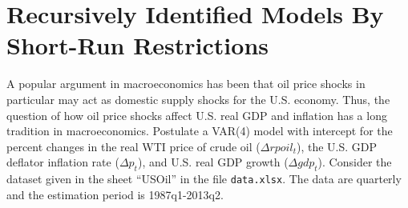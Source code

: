 \documentclass[a4paper]{scrartcl}
\begin{document}
    
    \section{Recursively Identified Models By Short-Run Restrictions}
    A popular argument in macroeconomics has been that oil price shocks in particular may act as domestic supply shocks for the U.S. economy. Thus, the question of how oil price shocks affect U.S. real GDP and inflation has a long tradition in macroeconomics. Postulate a VAR(4) model with intercept for the percent changes in the real WTI price of crude oil ($\Delta rpoil_t$), the U.S. GDP deflator inflation rate ($\Delta p_t$), and U.S. real GDP growth ($\Delta gdp_t$). Consider the dataset given in the sheet \enquote{USOil} in the file \texttt{data.xlsx}. The data are quarterly and the estimation period is 1987q1-2013q2. 
    
\end{document}
